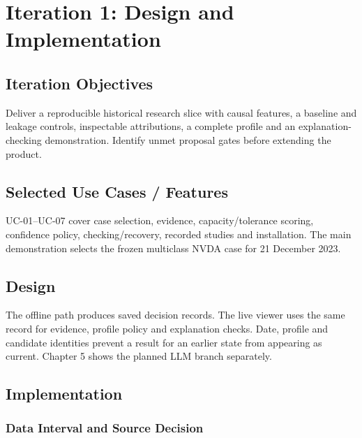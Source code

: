 \chapter{Iteration 1: Design and Implementation}
\section{Iteration Objectives}
Deliver a reproducible historical research slice with causal features, a baseline and leakage controls, inspectable attributions, a complete profile and an explanation-checking demonstration. Identify unmet proposal gates before extending the product.
\section{Selected Use Cases / Features}
UC-01--UC-07 cover case selection, evidence, capacity/tolerance scoring, confidence policy, checking/recovery, recorded studies and installation. The main demonstration selects the frozen multiclass NVDA case for 21 December 2023.
\section{Design}
The offline path produces saved decision records. The live viewer uses the same record for evidence, profile policy and explanation checks. Date, profile and candidate identities prevent a result for an earlier state from appearing as current. Chapter 5 shows the planned LLM branch separately.
\section{Implementation}
\subsection{Data Interval and Source Decision}

